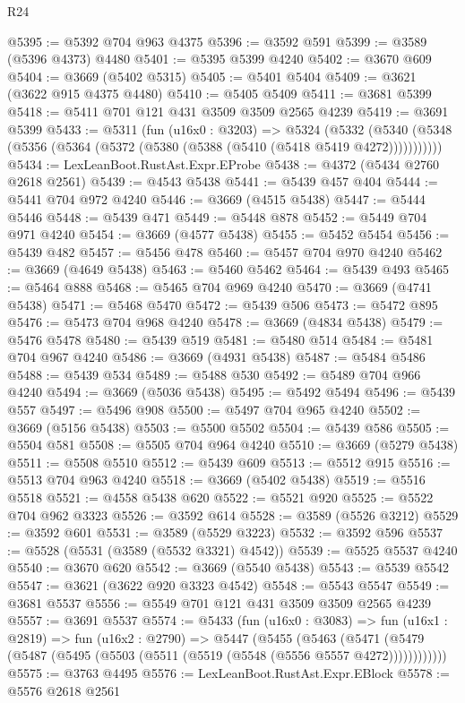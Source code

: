 \begin{lexlean}{R24}
\begin{coremodule}
@5395 := @5392 @704 @963 @4375
@5396 := @3592 @591
@5399 := @3589 (@5396 @4373) @4480
@5401 := @5395 @5399 @4240
@5402 := @3670 @609
@5404 := @3669 (@5402 @5315)
@5405 := @5401 @5404
@5409 := @3621 (@3622 @915 @4375 @4480)
@5410 := @5405 @5409
@5411 := @3681 @5399
@5418 := @5411 @701 @121 @431 @3509 @3509 @2565 @4239
@5419 := @3691 @5399
@5433 := @5311
    (fun (u16x0 : @3203) =>
    @5324
      (@5332 (@5340 (@5348 (@5356 (@5364 (@5372 (@5380 (@5388 (@5410 (@5418 @5419 @4272)))))))))))
@5434 := LexLeanBoot.RustAst.Expr.EProbe
@5438 := @4372 (@5434 @2760 @2618 @2561)
@5439 := @4543 @5438
@5441 := @5439 @457 @404
@5444 := @5441 @704 @972 @4240
@5446 := @3669 (@4515 @5438)
@5447 := @5444 @5446
@5448 := @5439 @471
@5449 := @5448 @878
@5452 := @5449 @704 @971 @4240
@5454 := @3669 (@4577 @5438)
@5455 := @5452 @5454
@5456 := @5439 @482
@5457 := @5456 @478
@5460 := @5457 @704 @970 @4240
@5462 := @3669 (@4649 @5438)
@5463 := @5460 @5462
@5464 := @5439 @493
@5465 := @5464 @888
@5468 := @5465 @704 @969 @4240
@5470 := @3669 (@4741 @5438)
@5471 := @5468 @5470
@5472 := @5439 @506
@5473 := @5472 @895
@5476 := @5473 @704 @968 @4240
@5478 := @3669 (@4834 @5438)
@5479 := @5476 @5478
@5480 := @5439 @519
@5481 := @5480 @514
@5484 := @5481 @704 @967 @4240
@5486 := @3669 (@4931 @5438)
@5487 := @5484 @5486
@5488 := @5439 @534
@5489 := @5488 @530
@5492 := @5489 @704 @966 @4240
@5494 := @3669 (@5036 @5438)
@5495 := @5492 @5494
@5496 := @5439 @557
@5497 := @5496 @908
@5500 := @5497 @704 @965 @4240
@5502 := @3669 (@5156 @5438)
@5503 := @5500 @5502
@5504 := @5439 @586
@5505 := @5504 @581
@5508 := @5505 @704 @964 @4240
@5510 := @3669 (@5279 @5438)
@5511 := @5508 @5510
@5512 := @5439 @609
@5513 := @5512 @915
@5516 := @5513 @704 @963 @4240
@5518 := @3669 (@5402 @5438)
@5519 := @5516 @5518
@5521 := @4558 @5438 @620
@5522 := @5521 @920
@5525 := @5522 @704 @962 @3323
@5526 := @3592 @614
@5528 := @3589 (@5526 @3212)
@5529 := @3592 @601
@5531 := @3589 (@5529 @3223)
@5532 := @3592 @596
@5537 := @5528 (@5531 (@3589 (@5532 @3321) @4542))
@5539 := @5525 @5537 @4240
@5540 := @3670 @620
@5542 := @3669 (@5540 @5438)
@5543 := @5539 @5542
@5547 := @3621 (@3622 @920 @3323 @4542)
@5548 := @5543 @5547
@5549 := @3681 @5537
@5556 := @5549 @701 @121 @431 @3509 @3509 @2565 @4239
@5557 := @3691 @5537
@5574 := @5433
    (fun (u16x0 : @3083) =>
    fun (u16x1 : @2819) =>
    fun (u16x2 : @2790) =>
    @5447
      (@5455
        (@5463
          (@5471 (@5479 (@5487 (@5495 (@5503 (@5511 (@5519 (@5548 (@5556 @5557 @4272))))))))))))
@5575 := @3763 @4495
@5576 := LexLeanBoot.RustAst.Expr.EBlock
@5578 := @5576 @2618 @2561

\end{coremodule}
\end{lexlean}
